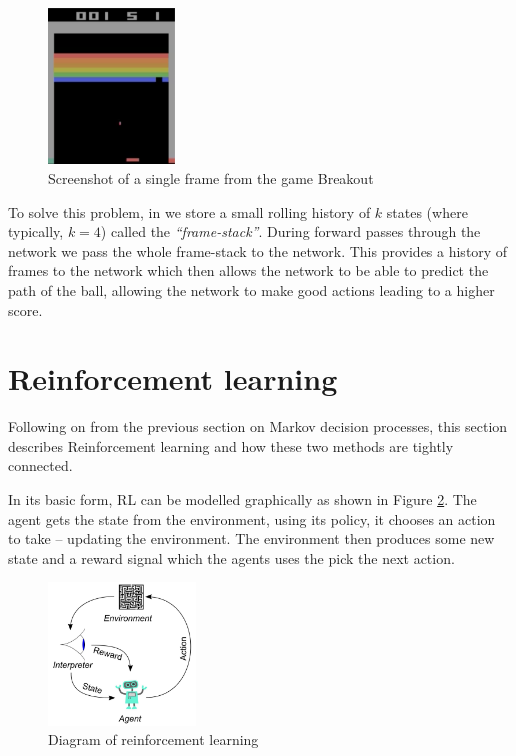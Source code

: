 \begin{figure}[htbp]
	\centering
	\includegraphics[width=0.30\textwidth]{chapters/chapter3/images/breakout.png}
	\caption[Screenshot of single breakout frame]{Screenshot of a single frame from the game Breakout
		\label{fig:breakout-brick-fig}
	}
\end{figure}

To solve this problem, in we store a small rolling history of $k$ states (where typically, $k = 4$) called the \textit{``frame-stack''}. During forward passes through the network we pass the whole frame-stack to the network. This provides a history of frames to the network which then allows the network to be able to predict the path of the ball, allowing the network to make good actions leading to a higher score.

\section{Reinforcement learning}
\label{dsgn:sec:rl}
Following on from the previous section on Markov decision processes, this section describes Reinforcement learning and how these two methods are tightly connected.

In its basic form, RL can be modelled graphically as shown in Figure \ref{fig:rl-diagram}. The agent gets the state from the environment, using its policy, it chooses an action to take -- updating the environment. The environment then produces some new state and a reward signal which the agents uses the pick the next action.

\begin{figure}[htbp]
	\centering
	\includegraphics[width=0.35\textwidth]{chapters/chapter3/images/rl.jpg}
	\caption{Diagram of reinforcement learning
		\label{fig:rl-diagram}
	}
\end{figure}

